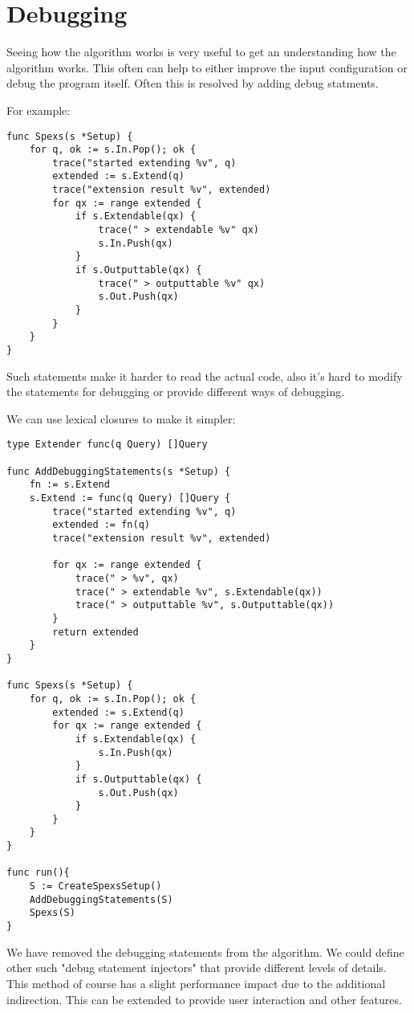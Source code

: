 \section{Debugging}

Seeing how the algorithm works is very useful to get an understanding how the algorithm works. This often can help to either improve the input configuration or debug the program itself. Often this is resolved by adding debug statments.

For example:

\begin{lstlisting}
func Spexs(s *Setup) {
    for q, ok := s.In.Pop(); ok {
        trace("started extending %v", q)
        extended := s.Extend(q)
        trace("extension result %v", extended)
        for qx := range extended {
            if s.Extendable(qx) {
                trace(" > extendable %v" qx)
                s.In.Push(qx)
            }
            if s.Outputtable(qx) {
                trace(" > outputtable %v" qx)
                s.Out.Push(qx)
            }
        }
    }
}
\end{lstlisting}

Such statements make it harder to read the actual code, also it's hard to modify the statements for debugging or provide different ways of debugging.

We can use lexical closures to make it simpler:

\begin{lstlisting}
type Extender func(q Query) []Query

func AddDebuggingStatements(s *Setup) {
    fn := s.Extend
    s.Extend := func(q Query) []Query {
        trace("started extending %v", q)
        extended := fn(q)
        trace("extension result %v", extended)
        
        for qx := range extended {
            trace(" > %v", qx)
            trace(" > extendable %v", s.Extendable(qx))
            trace(" > outputtable %v", s.Outputtable(qx))
        }
        return extended
    }
}

func Spexs(s *Setup) {
    for q, ok := s.In.Pop(); ok {
        extended := s.Extend(q)
        for qx := range extended {
            if s.Extendable(qx) {
                s.In.Push(qx)
            }
            if s.Outputtable(qx) {
                s.Out.Push(qx)
            }
        }
    }
}

func run(){
    S := CreateSpexsSetup()
    AddDebuggingStatements(S)
    Spexs(S)
}
\end{lstlisting}

We have removed the debugging statements from the algorithm. We could define other such "debug statement injectors" that provide different levels of details. This method of course has a slight performance impact due to the additional indirection. This can be extended to provide user interaction and other features.